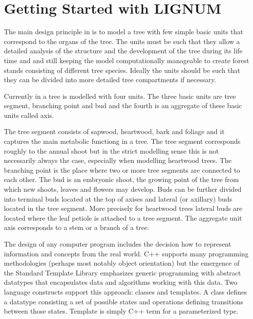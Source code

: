 \section{Getting Started with LIGNUM}

The  main design  principle in  \lignum is  to model  a tree  with few
simple  basic units that  correspond to  the organs  of the  tree. The
units  must  be  such that  they  allow  a  detailed analysis  of  the
structure and the development of the tree during its life time and and
still keeping  the model  computationally manageable to  create forest
stands consisting of different  tree species. Ideally the units should
be such that they can  be divided into more detailed tree compartments
if necessary.

Currently in  \lignum a tree is  modelled with four  units.  The three
basic units are  tree segment, branching point and  bud and the fourth
is an aggregate of these basic units called axis. 

The tree segment consists of  sapwood, heartwood, bark and foliage and
it captures the main metabolic  functiong in a tree.  The tree segment
corresponds roughly  to the annual  shoot but in the  strict modelling
sense  this  is  not  necessarily  always the  case,  especially  when
modelling heartwood trees.  The branching point is the place where two
or more  tree segments  are connected  to each other.   The bud  is an
embryonic shoot, the growing point  of the tree from which new shoots,
leaves  and flowers  may develop.   Buds can  be further  divided into
terminal buds located  at the top of axises  and lateral (or axillary)
buds located in the tree  segment.  More precisely for heartwood trees
lateral buds are located where the  leaf petiole is attached to a tree
segment. The aggregate unit axis corresponds  to a stem or a branch of
a tree.

The  design of  any  computer  program includes  the  decision how  to
represent information  and concepts from the real  world. C++ supports
many   programming   methodologies   (perhaps  most   notably   object
orientation)  but  the  emergence  of the  Standard  Template  Library
emphasizes   generic   programming   with  abstract   datatypes   that
encapsulates data and algorithms  working with this data. Two language
constructs  support  this approach:  classes  and  templates. A  class
defines a datatype consisting a  set of possible states and operations
defining transitions between those states. Template is simply C++ term
for a parameterized type. 
